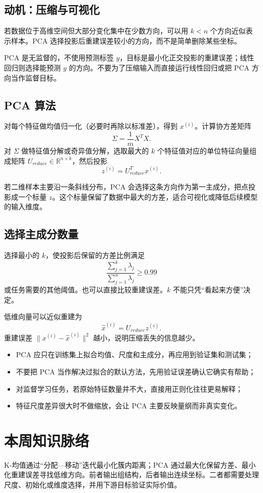 \subsection{动机：压缩与可视化}
\begin{definitionbox}[低维表示]
若数据位于高维空间但大部分变化集中在少数方向，可以用 $k<n$ 个方向近似表示样本。PCA 选择投影后重建误差较小的方向，而不是简单删除某些坐标。
\end{definitionbox}
\begin{keybox}
PCA 是无监督的，不使用预测标签 $y$，目标是最小化正交投影的重建误差；线性回归则选择能预测 $y$ 的方向。不要为了压缩输入而直接运行线性回归或把 PCA 方向当作监督目标。
\end{keybox}
\subsection{PCA 算法}
\begin{definitionbox}[标准步骤]
对每个特征做均值归一化（必要时再除以标准差），得到 $x^{(i)}$。计算协方差矩阵
\[
\Sigma=\frac1mX^TX.
\]
对 $\Sigma$ 做特征值分解或奇异值分解，选取最大的 $k$ 个特征值对应的单位特征向量组成矩阵 $U_{reduce}\in\mathbb R^{n\times k}$，然后投影
\[
z^{(i)}=U_{reduce}^Tx^{(i)}.
\]
\end{definitionbox}
\begin{examplebox}[二维到一维]
若二维样本主要沿一条斜线分布，PCA 会选择这条方向作为第一主成分，把点投影成一个标量 $z$。这个标量保留了数据中最大的方差，适合可视化或降低后续模型的输入维度。
\end{examplebox}
\subsection{选择主成分数量}
\begin{tipbox}[保留方差比例]
选择最小的 $k$，使投影后保留的方差比例满足
\[
\frac{\sum_{j=1}^{k}\lambda_j}{\sum_{j=1}^{n}\lambda_j}\geq0.99
\]
或任务需要的其他阈值。也可以直接比较重建误差。$k$ 不能只凭“看起来方便”决定。
\end{tipbox}
\begin{definitionbox}[重建与信息损失]
低维向量可以近似重建为
\[
\hat x^{(i)}=U_{reduce}z^{(i)}.
\]
重建误差 $\|x^{(i)}-\hat x^{(i)}\|^2$ 越小，说明压缩丢失的信息越少。
\end{definitionbox}
\begin{mistakebox}
\begin{itemize}
  \item PCA 应只在训练集上拟合均值、尺度和主成分，再应用到验证集和测试集；
  \item 不要把 PCA 当作解决过拟合的默认方法，先用验证误差确认它确实有帮助；
  \item 对监督学习任务，若原始特征数量并不大，直接用正则化往往更易解释；
  \item 特征尺度差异很大时不做缩放，会让 PCA 主要反映量纲而非真实变化。
\end{itemize}
\end{mistakebox}

\section{本周知识脉络}
\begin{keybox}[聚类与降维]
K-均值通过“分配—移动”迭代最小化簇内距离；PCA 通过最大化保留方差、最小化重建误差寻找低维方向。前者输出组结构，后者输出连续坐标。二者都需要处理尺度、初始化或维度选择，并用下游目标验证实际价值。
\end{keybox}

